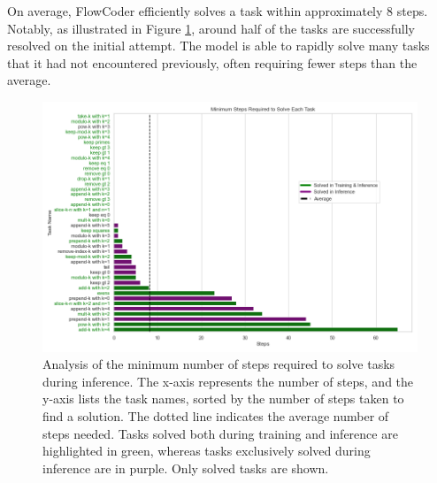On average, FlowCoder efficiently solves a task within approximately 8 steps. Notably, as illustrated in Figure \ref{fig:plot_min_step_for_solution_inference}, around half of the tasks are successfully resolved on the initial attempt. The model is able to rapidly solve many tasks that it had not encountered previously, often requiring fewer steps than the average.

\begin{figure}[H]
    \centering
    \includegraphics[width=\textwidth]{../img/plot_min_step_for_solution_inference.png}
    \caption{Analysis of the minimum number of steps required to solve tasks during inference. The x-axis represents the number of steps, and the y-axis lists the task names, sorted by the number of steps taken to find a solution. The dotted line indicates the average number of steps needed. Tasks solved both during training and inference are highlighted in green, whereas tasks exclusively solved during inference are in purple. Only solved tasks are shown.}
    \label{fig:plot_min_step_for_solution_inference}
\end{figure}
